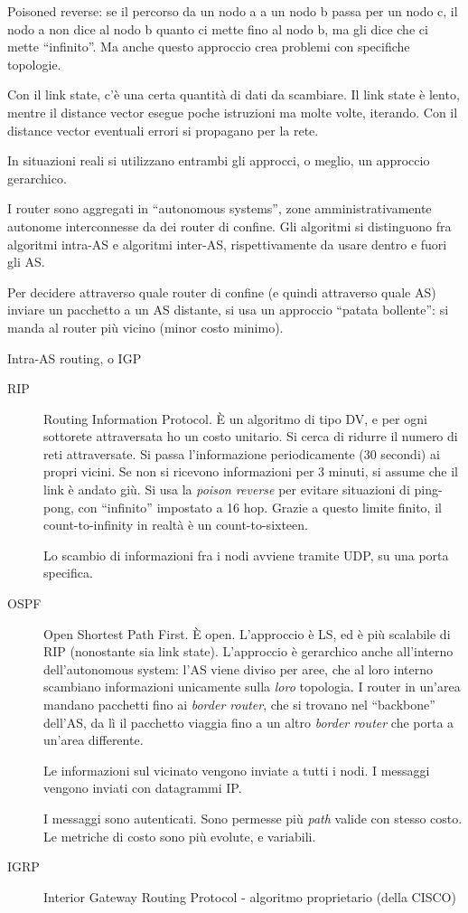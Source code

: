 Poisoned reverse: se il percorso da un nodo a a un nodo b passa per un nodo c, il nodo a non dice al nodo b quanto ci mette fino al nodo b, ma gli dice che ci mette ``infinito''. Ma anche questo approccio crea problemi con specifiche topologie.


Con il link state, c'\`e una certa quantit\`a di dati da scambiare. Il link state \`e lento, mentre il distance vector esegue poche istruzioni ma molte volte, iterando. Con il distance vector eventuali errori si propagano per la rete.

In situazioni reali si utilizzano entrambi gli approcci, o meglio, un approccio gerarchico.

I router sono aggregati in ``autonomous systems'', zone amministrativamente autonome interconnesse da dei router di confine. Gli algoritmi si distinguono fra algoritmi intra-AS e algoritmi inter-AS, rispettivamente da usare dentro e fuori gli AS.

Per decidere attraverso quale router di confine (e quindi attraverso quale AS) inviare un pacchetto a un AS distante, si usa un approccio ``patata bollente'': si manda al router pi\`u vicino (minor costo minimo).

Intra-AS routing, o IGP
\begin{description}
    \item[RIP] Routing Information Protocol. \`E un algoritmo di tipo DV, e per ogni sottorete attraversata ho un costo unitario. Si cerca di ridurre il numero di reti attraversate. Si passa l'informazione periodicamente (30 secondi) ai propri vicini. Se non si ricevono informazioni per 3 minuti, si assume che il link \`e andato gi\`u. Si usa la \emph{poison reverse} per evitare situazioni di ping-pong, con ``infinito'' impostato a 16 hop. Grazie a questo limite finito, il count-to-infinity in realt\`a \`e un count-to-sixteen.

    Lo scambio di informazioni fra i nodi avviene tramite UDP, su una porta specifica.
    \item[OSPF] Open Shortest Path First. \`E open. L'approccio \`e LS, ed \`e pi\`u scalabile di RIP (nonostante sia link state). L'approccio \`e gerarchico anche all'interno dell'autonomous system: l'AS viene diviso per aree, che al loro interno scambiano informazioni unicamente sulla \emph{loro} topologia. I router in un'area mandano pacchetti fino ai \emph{border router}, che si trovano nel ``backbone'' dell'AS, da l\`i il pacchetto viaggia fino a un altro \emph{border router} che porta a un'area differente.

    Le informazioni sul vicinato vengono inviate a tutti i nodi. I messaggi vengono inviati con datagrammi IP.

    I messaggi sono autenticati. Sono permesse pi\`u \emph{path} valide con stesso costo. Le metriche di costo sono pi\`u evolute, e variabili.
    \item[IGRP] Interior Gateway Routing Protocol - algoritmo proprietario (della CISCO)
\end{description}

